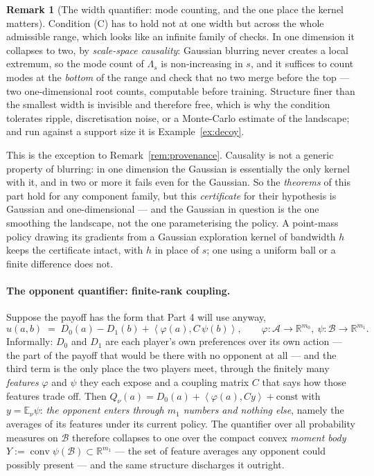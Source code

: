 \documentclass[11pt]{article}
\theoremstyle{definition}
\newtheorem{remark}[theorem]{Remark}
\newcommand{\R}{\mathbb{R}}
\newcommand{\E}{\mathbb{E}}
\newcommand{\cA}{\mathcal{A}}
\newcommand{\cB}{\mathcal{B}}
\newcommand{\ip}[2]{\left\langle #1, #2 \right\rangle}
\DeclareMathOperator{\conv}{conv}
\begin{document}
\begin{remark}[The width quantifier: mode counting, and the one place the kernel
matters]\label{rem:check}
Condition (C) has to hold not at one width but across the whole admissible range,
which looks like an infinite family of checks. In one dimension it collapses to
two, by \emph{scale-space causality}: Gaussian blurring never creates a local
extremum, so the mode count of $\Lambda_s$ is non-increasing in $s$, and it
suffices to count modes at the \emph{bottom} of the range and check that no two
merge before the top --- two one-dimensional root counts, computable before
training. Structure finer than the smallest width is invisible and therefore
free, which is why the condition tolerates ripple, discretisation noise, or a
Monte-Carlo estimate of the landscape; and run against a support size it is
Example~\ref{ex:decoy}.

This is the exception to Remark~\ref{rem:provenance}. Causality is not a generic
property of blurring: in one dimension the Gaussian is essentially the only kernel
with it, and in two or more it fails even for the Gaussian. So the
\emph{theorems} of this part hold for any component family, but this
\emph{certificate} for their hypothesis is Gaussian and one-dimensional --- and
the Gaussian in question is the one smoothing the landscape, not the one
parameterising the policy. A point-mass policy drawing its gradients from a
Gaussian exploration kernel of bandwidth $h$ keeps the certificate intact, with
$h$ in place of $s$; one using a uniform ball or a finite difference does not.
\end{remark}

\paragraph{The opponent quantifier: finite-rank coupling.} Suppose the payoff has
the form that Part 4 will use anyway,
\begin{equation}\label{eq:finiterank}
  u(a,b) \;=\; D_0(a) - D_1(b) + \ip{\varphi(a)}{C\,\psi(b)},
  \qquad \varphi : \cA \to \R^{m_0},\ \psi : \cB \to \R^{m_1} .
\end{equation}
Informally: $D_0$ and $D_1$ are each player's own preferences over its own action
--- the part of the payoff that would be there with no opponent at all --- and the
third term is the only place the two players meet, through the finitely many
\emph{features} $\varphi$ and $\psi$ they each expose and a coupling matrix $C$
that says how those features trade off. Then
$Q_\nu(a) = D_0(a) + \ip{\varphi(a)}{Cy} + \mathrm{const}$ with
$y = \E_\nu \psi$: \emph{the opponent enters through $m_1$ numbers and nothing
else}, namely the averages of its features under its current policy. The
quantifier over all probability measures on $\cB$ therefore collapses to one over
the compact convex \emph{moment body} $Y := \conv \psi(\cB) \subset \R^{m_1}$ ---
the set of feature averages any opponent could possibly present --- and the same
structure discharges it outright.
\end{document}
